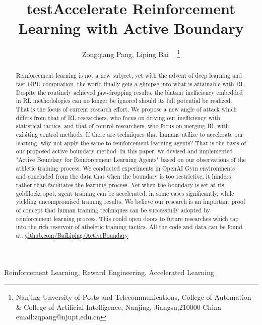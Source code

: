 \documentclass[journal]{IEEEtran}
\begin{document}
    \title{test}
\title{Accelerate Reinforcement Learning with Active Boundary}

\author{ Zongqiang Pang, Liping Bai ~ \thanks{Nanjing Unversity of Posts and Telecommunications, College of Automation \& College of Artificial Intelligence, Nanjing, Jiangsu,210000 China email:zqpang@njupt.edu.cn}}
\maketitle
\begin{abstract}
Reinforcement learning is not a new subject, yet with the advent of deep learning and fast GPU compuation, the world finally gets a glimpse into what is attainable with RL. Despite the routinely achieved jaw-dropping results, the blatant inefficiency embedded in RL methodologies can no longer be ignored should its full potential be realized. That is the focus of current research effort. We propose a new angle of attack which differs from that of RL researchers, who focus on driving out inefficiency with statistical tactics, and that of control researchers, who focus on merging RL with exisiting control methods. If there are techniques that humans utilize to accelerate our learning, why not apply the same to reinforcement learning agents? That is the basis of our proposed active boundary method. In this paper, we devised and implemented "Active Boundary for Reinforcement Learning Agents" based on our observations of the athletic training process. We conducted experiments in OpenAI Gym environments and concluded from the data that when the boundary is too restrictive, it hinders rather than facilitates the learning process. Yet when the boundary is set at its goldilocks spot, agent training can be accelerated, in some cases significantly, while yielding uncompromised training results. We believe our research is an important proof of concept that human training techniques can be successfully adopted by reinforcement learning process. This could open doors to future researches which tap into the rich reservoir of atheletic training tactics. All the code and data can be found at: \href{https://github.com/BaiLiping/ActiveBoundary}{github.com/BaiLiping/ActiveBoundary}
\end{abstract}
\begin{IEEEkeywords}
Reinforcement Learning, Reward Engineering, Accelerated Learning
\end{IEEEkeywords}
\IEEEpeerreviewmaketitle
\end{document}
